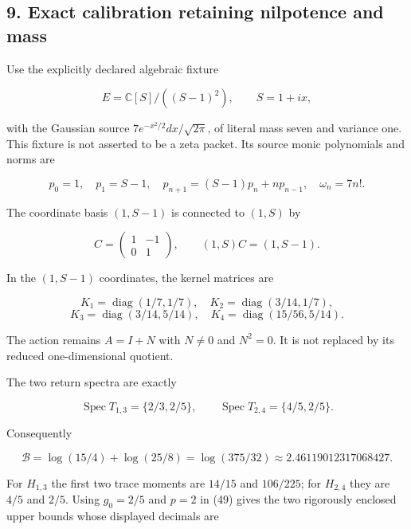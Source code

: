 \subsection{9. Exact calibration retaining nilpotence and mass}\label{endpoint-restriction_original--exact-calibration-retaining-nilpotence-and-mass}

Use the explicitly declared algebraic fixture

\[
 E=\mathbb C[S]/((S-1)^2),\qquad S=1+ix,
                                                                    \tag{59}
\]

with the Gaussian source \(7e^{-x^2/2}dx/\sqrt{2\pi}\), of literal mass seven and variance one. This fixture is not asserted to be a zeta packet. Its source monic polynomials and norms are

\[
 p_0=1,\quad p_1=S-1,\quad
 p_{n+1}=(S-1)p_n+n p_{n-1},\quad \omega_n=7n!.                    \tag{60}
\]

The coordinate basis \((1,S-1)\) is connected to \((1,S)\) by

\[
 C=\begin{pmatrix}1&-1\\0&1\end{pmatrix},\qquad
 (1,S)C=(1,S-1).                                                  \tag{61}
\]

In the \((1,S-1)\) coordinates, the kernel matrices are

\[
 K_1=\operatorname{diag}(1/7,1/7),\quad
 K_2=\operatorname{diag}(3/14,1/7),
\] \[
 K_3=\operatorname{diag}(3/14,5/14),\quad
 K_4=\operatorname{diag}(15/56,5/14).                              \tag{62}
\]

The action remains \(A=I+N\) with \(N\ne0\) and \(N^2=0\). It is not replaced by its reduced one-dimensional quotient.

The two return spectra are exactly

\[
 \operatorname{Spec}T_{1,3}=\{2/3,2/5\},\qquad
 \operatorname{Spec}T_{2,4}=\{4/5,2/5\}.                           \tag{63}
\]

Consequently

\[
 \mathcal B=\log(15/4)+\log(25/8)=\log(375/32)
 \approx2.46119012317068427.                                      \tag{64}
\]

For \(H_{1,3}\) the first two trace moments are \(14/15\) and \(106/225\); for \(H_{2,4}\) they are \(4/5\) and \(2/5\). Using \(g_0=2/5\) and \(p=2\) in (49) gives the two rigorously enclosed upper bounds whose displayed decimals are

